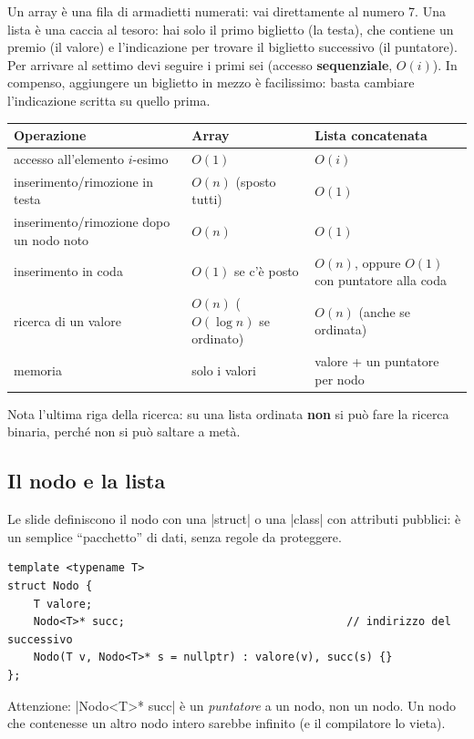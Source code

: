 \begin{analogia}
Un array è una fila di armadietti numerati: vai direttamente al numero 7. Una lista è
una caccia al tesoro: hai solo il primo biglietto (la testa), che contiene un premio
(il valore) e l'indicazione per trovare il biglietto successivo (il puntatore). Per
arrivare al settimo devi seguire i primi sei (accesso \textbf{sequenziale}, $O(i)$).
In compenso, aggiungere un biglietto in mezzo è facilissimo: basta cambiare
l'indicazione scritta su quello prima.
\end{analogia}

\begin{center}\small
\begin{tabular}{p{5.4cm}p{3.6cm}p{5.4cm}}
\toprule
\textbf{Operazione} & \textbf{Array} & \textbf{Lista concatenata} \\
\midrule
accesso all'elemento $i$-esimo & $O(1)$ & $O(i)$ \\
inserimento/rimozione in testa & $O(n)$ (sposto tutti) & $O(1)$ \\
inserimento/rimozione dopo un nodo noto & $O(n)$ & $O(1)$ \\
inserimento in coda & $O(1)$ se c'è posto & $O(n)$, oppure $O(1)$ con puntatore alla coda \\
ricerca di un valore & $O(n)$ ($O(\log n)$ se ordinato) & $O(n)$ (anche se ordinata) \\
memoria & solo i valori & valore + un puntatore per nodo \\
\bottomrule
\end{tabular}
\end{center}
Nota l'ultima riga della ricerca: su una lista ordinata \textbf{non} si può fare la
ricerca binaria, perché non si può saltare a metà.

\subsection*{Il nodo e la lista}

Le slide definiscono il nodo con una \cc|struct| o una \cc|class| con attributi
pubblici: è un semplice ``pacchetto'' di dati, senza regole da proteggere.
\begin{lstlisting}
template <typename T>
struct Nodo {
    T valore;
    Nodo<T>* succ;                                  // indirizzo del successivo
    Nodo(T v, Nodo<T>* s = nullptr) : valore(v), succ(s) {}
};
\end{lstlisting}
Attenzione: \cc|Nodo<T>* succ| è un \emph{puntatore} a un nodo, non un nodo. Un nodo
che contenesse un altro nodo intero sarebbe infinito (e il compilatore lo vieta).

